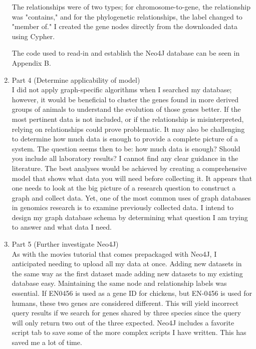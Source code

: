 \documentclass[]{article}
\begin{document}
\begin{enumerate}
The relationships were of two types; for chromosome-to-gene, the relationship was "contains," and for the phylogenetic relationships, the label changed to "member of."  I created the gene nodes directly from the downloaded data using Cypher.

The code used to read-in and establish the Neo4J database can be seen in Appendix B.


\item Part 4 (Determine applicability of model)\\
I did not apply graph-specific algorithms when I searched my database; however, it would be beneficial to cluster the genes found in more derived groups of animals to understand the evolution of those genes better.  If the most pertinent data is not included, or if the relationship is misinterpreted, relying on relationships could prove problematic.  It may also be challenging to determine how much data is enough to provide a complete picture of a system.  The question seems then to be: how much data is enough?  Should you include all laboratory results?  I cannot find any clear guidance in the literature.  The best analyses would be achieved by creating a comprehensive model that shows what data you will need before collecting it.  It appears that one needs to look at the big picture of a research question to construct a graph and collect data.  Yet, one of the most common uses of graph databases in genomics research is to examine previously collected data.  I intend to design my graph database schema by determining what question I am trying to answer and what data I need.

\item Part 5 (Further investigate Neo4J)\\
As with the movies tutorial that comes prepackaged with Neo4J, I anticipated needing to upload all my data at once.  Adding new datasets in the same way as the first dataset made adding new datasets to my existing database easy.  Maintaining the same node and relationship labels was essential.  If EN0456 is used as a gene ID for chickens, but EN-0456 is used for humans, these two genes are considered different.  This will yield incorrect query results if we search for genes shared by three species since the query will only return two out of the three expected.  Neo4J includes a favorite script tab to save some of the more complex scripts I have written.  This has saved me a lot of time.
\end{enumerate}
\end{document}
